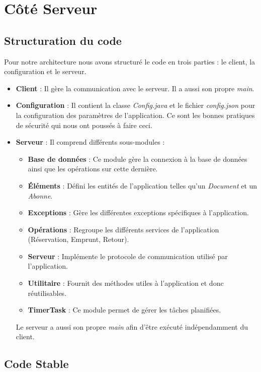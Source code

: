 \chapter{Côté Serveur}


\section{Structuration du code}

Pour notre architecture nous avons structuré le code en trois parties : le client, la configuration et le serveur.

\begin{itemize}
    \item \textbf{Client} : Il gère la communication avec le serveur. Il a aussi son propre \textit{main}.
    \item \textbf{Configuration} : Il contient la classe \textit{Config.java} et le fichier \textit{config.json} pour la configuration des paramètres de l'application. Ce sont les bonnes pratiques de sécurité qui nous ont poussés à faire ceci.
    \item \textbf{Serveur} : Il comprend différents sous-modules :
    \begin{itemize}
        \item \textbf{Base de données} : Ce module gère la connexion à la base de données ainsi que les opérations sur cette dernière.
        \item \textbf{Éléments} : Défini les entités de l’application telles qu’un \textit{Document} et un \textit{Abonne}.
        \item \textbf{Exceptions} : Gère les différentes exceptions spécifiques à l’application.
        \item \textbf{Opérations} : Regroupe les différents services de l’application (Réservation, Emprunt, Retour).
        \item \textbf{Serveur} : Implémente le protocole de communication utilisé par l’application.
        \item \textbf{Utilitaire} : Fournit des méthodes utiles à l’application et donc réutilisables.
        \item \textbf{TimerTask} : Ce module permet de gérer les tâches planifiées.
    \end{itemize}
    Le serveur a aussi son propre \textit{main} afin d'être exécuté indépendamment du client.
\end{itemize}


\section{Code Stable}

